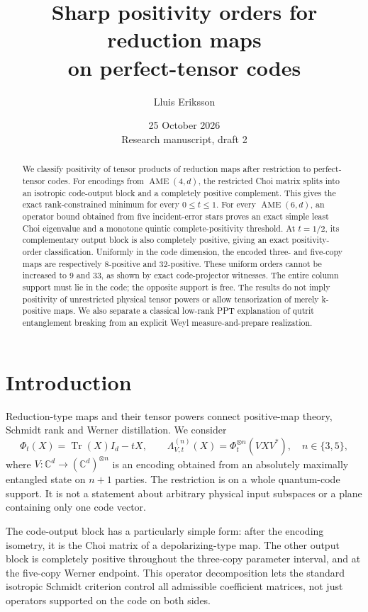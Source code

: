 \documentclass[11pt,a4paper]{article}
\title{Sharp positivity orders for reduction maps\\on perfect-tensor codes}
\author{Lluis Eriksson}
\date{25 October 2026\\\small Research manuscript, draft 2}
\newcommand{\Tr}{\operatorname{Tr}}
\newcommand{\C}{\mathbb C}
\begin{document}
\maketitle
\begin{abstract}
We classify positivity of tensor products of reduction maps after restriction to perfect-tensor codes. For encodings from \(\operatorname{AME}(4,d)\), the restricted Choi matrix splits into an isotropic code-output block and a completely positive complement. This gives the exact rank-constrained minimum for every \(0\le t\le1\). For every \(\operatorname{AME}(6,d)\), an operator bound obtained from five incident-error stars proves an exact simple least Choi eigenvalue and a monotone quintic complete-positivity threshold. At \(t=1/2\), its complementary output block is also completely positive, giving an exact positivity-order classification. Uniformly in the code dimension, the encoded three- and five-copy maps are respectively 8-positive and 32-positive. These uniform orders cannot be increased to 9 and 33, as shown by exact code-projector witnesses. The entire column support must lie in the code; the opposite support is free. The results do not imply positivity of unrestricted physical tensor powers or allow tensorization of merely k-positive maps. We also separate a classical low-rank PPT explanation of qutrit entanglement breaking from an explicit Weyl measure-and-prepare realization.
\end{abstract}

\section{Introduction}
Reduction-type maps and their tensor powers connect positive-map theory, Schmidt rank and Werner distillation. We consider
\[
 \Phi_t(X)=\Tr(X)I_d-tX,\qquad
 \Lambda^{(n)}_{V,t}(X)=\Phi_t^{\otimes n}(VXV^*),\quad n\in\{3,5\},
\]
where \(V:\C^d\to(\C^d)^{\otimes n}\) is an encoding obtained from an absolutely maximally entangled state on \(n+1\) parties. The restriction is on a whole quantum-code support. It is not a statement about arbitrary physical input subspaces or a plane containing only one code vector.

The code-output block has a particularly simple form: after the encoding isometry, it is the Choi matrix of a depolarizing-type map. The other output block is completely positive throughout the three-copy parameter interval, and at the five-copy Werner endpoint. This operator decomposition lets the standard isotropic Schmidt criterion control all admissible coefficient matrices, not just operators supported on the code on both sides.
\end{document}
